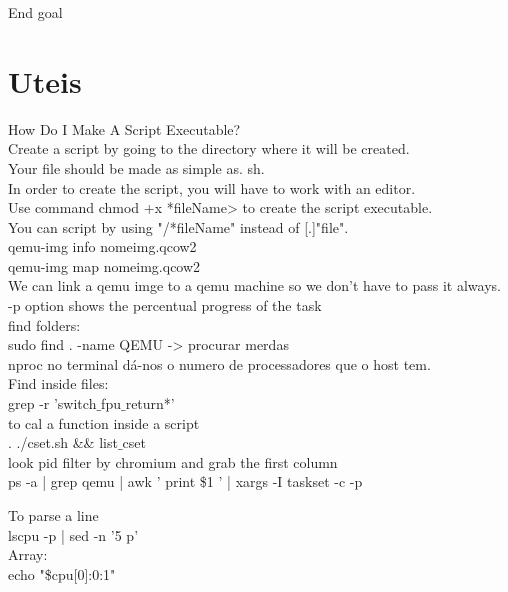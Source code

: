 \documentclass[11pt, a4paper, oneside]{article}
\theoremstyle{definition}
\begin{document}
End goal\\

\vfill
\pagebreak
\section{Uteis}

How Do I Make A Script Executable?\\
Create a script by going to the directory where it will be created.\\
Your file should be made as simple as. sh.\\
In order to create the script, you will have to work with an editor.\\
Use command chmod +x *fileName> to create the script executable.\\
You can script by using "/*fileName" instead of [.]"file".\\

qemu-img info nomeimg.qcow2\\
qemu-img map nomeimg.qcow2\\

We can link a qemu imge to a qemu machine so we don't have to pass it always. \\

-p option shows the percentual progress of the task\\

find folders:\\
sudo find . -name QEMU -> procurar merdas\\

nproc no terminal dá-nos o numero de processadores que o host tem.\\

Find inside files:\\
grep -r 'switch$\_$fpu$\_$return*'\\


to cal a function inside a script\\
. ./cset.sh \&\& list$\_$cset\\

look pid filter by chromium and grab the first column\\
ps -a | grep qemu | awk '{ print \$1 }' | xargs -I{} taskset -c -p {}

To parse a line\\
lscpu -p | sed -n '5 p'\\

Array:\\
echo "\${cpu[0]:0:1}"
\end{document}
